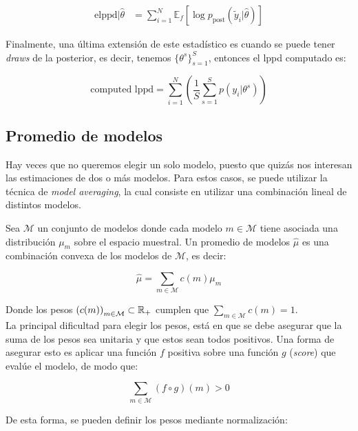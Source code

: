 \begin{align}
\text{elppd}|\hat{\theta} & = \sum_{i=1}^N \mathbb{E}_f[\log p_{\text{post}}(\tilde{y}_i|\hat{\theta})]
\end{align}

Finalmente, una última extensión de este estadístico es cuando se puede tener \emph{draws} de la posterior, es decir, tenemos $\{ \theta^s\}_{s=1}^S$, entonces el lppd computado es:

\begin{equation}
\text{computed lppd} = \sum_{i=1}^N \left( \frac{1}{S} \sum_{s=1}^S p(y_i|\theta^s)\right)
\end{equation}


\subsection{Promedio de modelos}
Hay veces que no queremos elegir un solo modelo, puesto que quizás nos interesan las estimaciones de dos o más modelos. Para estos casos, se puede utilizar la técnica de \emph{model averaging}, la cual consiste en utilizar una combinación lineal de distintos modelos.\\

\newpage

Sea $\mathcal{M}$ un conjunto de modelos donde cada modelo $m\in\mathcal{M}$ tiene asociada una distribución $\mu_m$ sobre el espacio muestral. Un promedio de modelos $\hat{\mu}$ es una combinación convexa de los modelos de $\mathcal{M}$, es decir:

\begin{equation}
\hat{\mu} = \sum_{m\in \mathcal{M}} c(m) \mu_m
\end{equation}

Donde los pesos $\left(c(m)\right)_{m\in\mathcal{M}}\subset\mathbb{R}_+$ cumplen que $\sum_{m\in \mathcal{M}} c(m) = 1$.\\

La principal dificultad para elegir los pesos, está en que se debe asegurar que la suma de los pesos sea unitaria y que estos sean todos positivos. Una forma de asegurar esto es aplicar una función $f$ positiva sobre una función $g$ (\emph{score}) que evalúe el modelo, de modo que:

\begin{equation}
\sum_{m\in \mathcal{M}} (f\circ g)(m) > 0
\end{equation}

De esta forma, se pueden definir los pesos mediante normalización:

